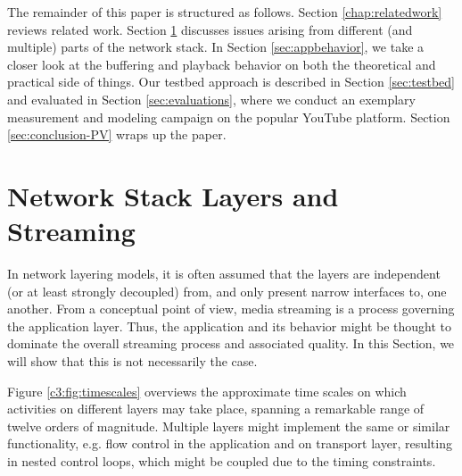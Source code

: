 The remainder of this paper is structured as follows. Section \ref{chap:relatedwork} reviews related work. Section \ref{sec:analysis} discusses issues arising from different (and multiple) parts of the network stack. In Section \ref{sec:appbehavior}, we take a closer look at the buffering and playback behavior on both the theoretical and practical side of things. Our testbed approach is described in Section \ref{sec:testbed} and evaluated in Section \ref{sec:evaluations}, where we conduct an exemplary measurement and modeling campaign on the popular YouTube platform. Section \ref{sec:conclusion-PV} wraps up the paper.





\section{Network Stack Layers and Streaming}
\label{sec:analysis}

In network layering models, it is often assumed that the layers are independent (or at least strongly decoupled) from, and only present narrow interfaces to, one another. From a conceptual point of view, media streaming is a process governing the application layer. Thus, the application and its behavior might be thought to dominate the overall streaming process and associated quality. In this Section, we will show that this is not necessarily the case. %


Figure \ref{c3:fig:timescales} overviews the approximate time scales on which activities on different layers may take place, spanning a remarkable range of twelve orders of magnitude. Multiple layers might implement the same or similar functionality, e.g. flow control in the application and on transport layer, resulting in nested control loops, which might be coupled due to the timing constraints. 




